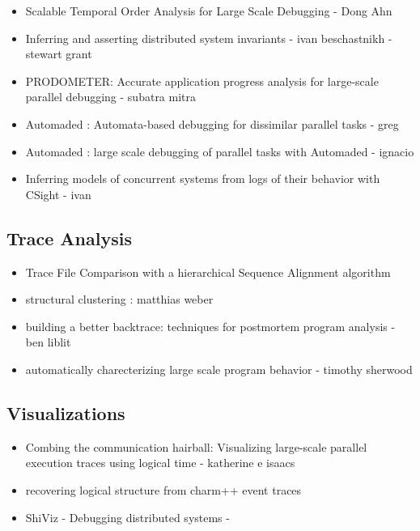 \begin{itemize}
\item Scalable Temporal Order Analysis for Large Scale Debugging - Dong Ahn \cite{Ahn:2009}
\item Inferring and asserting distributed system invariants -  ivan beschastnikh - stewart grant \cite{grant18}
\item PRODOMETER: Accurate application progress analysis for large-scale parallel debugging - subatra mitra \cite{prodometer}
\item Automaded : Automata-based debugging for dissimilar parallel tasks - greg \cite{automaded-GBron}
\item Automaded : large scale debugging of parallel tasks with Automaded - ignacio \cite{automaded-laguna}

\item Inferring models of concurrent systems from logs of their behavior with CSight - ivan \cite{beschastnikh-csight}
\end{itemize}




\subsection{Trace Analysis}


\begin{itemize}
\item Trace File Comparison with a hierarchical Sequence Alignment algorithm \cite{weber-seqAlign}
\item structural clustering : matthias weber \cite{weberStructural}
\item building a better backtrace: techniques for postmortem program analysis - ben liblit \cite{liblit02}
\item automatically charecterizing large scale program behavior - timothy sherwood \cite{sherwood02}
\end{itemize}


\subsection{Visualizations}


\begin{itemize}
\item Combing the communication hairball: Visualizing large-scale parallel execution traces using logical time - katherine e isaacs \cite{ravel}
\item recovering logical structure from charm++ event traces \cite{charmVis}
\item ShiViz - Debugging distributed systems - \cite{shiviz}
\end{itemize}



